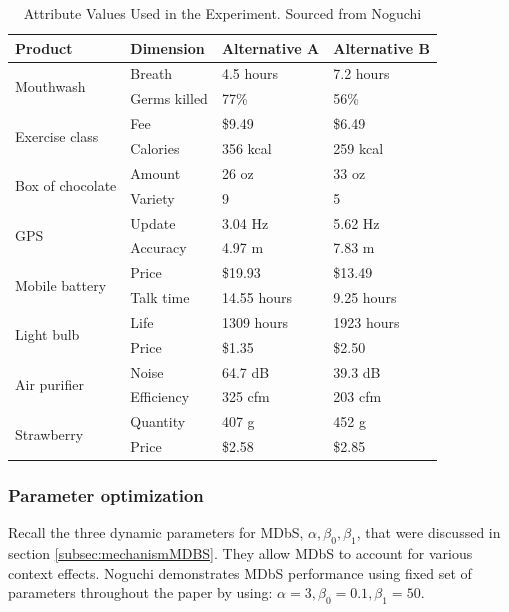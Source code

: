\documentclass[a4paper,12pt]{article}
\newcommand{\citeyearonly}[1]{\citeyearpar{#1}}
\begin{document}
\begin{table}
\centering

\begin{tabular}{l|lll}
\hline
Product & Dimension & Alternative A & Alternative B \\
\hline
\multirow{2}{*}{Mouthwash} & Breath & 4.5 hours & 7.2 hours \\
 & Germs killed & 77\% & 56\% \\[2ex]
\multirow{2}{*}{Exercise class} & Fee & \$9.49 & \$6.49 \\
 & Calories & 356 kcal & 259 kcal \\[2ex]
\multirow{2}{*}{Box of chocolate} & Amount & 26 oz & 33 oz \\
 & Variety & 9 & 5 \\[2ex]
\multirow{2}{*}{GPS} & Update & 3.04 Hz & 5.62 Hz \\
 & Accuracy & 4.97 m & 7.83 m \\[2ex]
\multirow{2}{*}{Mobile battery} & Price & \$19.93 & \$13.49 \\
 & Talk time & 14.55 hours & 9.25 hours \\[2ex]
\multirow{2}{*}{Light bulb} & Life & 1309 hours & 1923 hours \\
 & Price & \$1.35 & \$2.50 \\[2ex]
\multirow{2}{*}{Air purifier} & Noise & 64.7 dB & 39.3 dB \\
 & Efficiency & 325 cfm & 203 cfm \\[2ex]
\multirow{2}{*}{Strawberry} & Quantity & 407 g & 452 g \\
 & Price & \$2.58 & \$2.85 \\
\hline
\end{tabular}
\caption{Attribute Values Used in the Experiment. Sourced from Noguchi \citeyearonly{noguchi2018multialternative}}
\label{tab:noguchiDescriptions}
\end{table}

\subsubsection{Parameter optimization}

Recall the three dynamic parameters for MDbS, $\alpha, \beta_0, \beta_1$, that were discussed in section \ref{subsec:mechanismMDBS}. They allow MDbS to account for various context effects. Noguchi \citeyearonly{noguchi2018multialternative} demonstrates MDbS performance using fixed set of parameters throughout the paper by using: $\alpha = 3, \beta_0 = 0.1, \beta_1 = 50$. 
\end{document}
